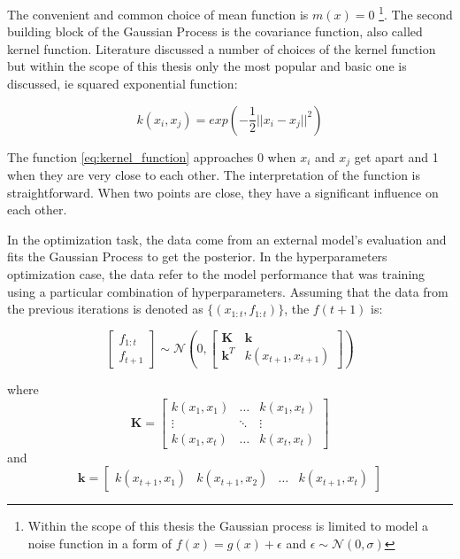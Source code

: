 The convenient and common choice of mean function is $m(x) = 0$ \footnote{ Within the scope of this thesis the Gaussian process is limited to model a noise function in a form of $f(x) = g(x) + \epsilon$ and $\epsilon \sim \mathcal{N}(0, \sigma)$ }. 
The second building block of the Gaussian Process is the covariance function, also called kernel function. Literature discussed a number of choices of the kernel function but within the scope of this thesis only the most popular and basic one is discussed, ie squared exponential function: 

\begin{equation}
\label{eq:kernel_function}
    k(x_i,x_j) = exp\left( - \frac{1}{2} ||x_i - x_j||^2 \right)
\end{equation}

The function \ref{eq:kernel_function} approaches $0$ when $x_i$ and $x_j$ get apart and 1 when they are very close to each other. The interpretation of the function is straightforward. When two points are close, they have a significant influence on each other. 

In the optimization task, the data come from an external model's evaluation and fits the Gaussian Process to get the posterior. In the hyperparameters optimization case, the data refer to the model performance that was training using a particular combination of hyperparameters.     
Assuming that the data from the previous iterations is denoted as $\{ (x_{1:t}, f_{1:t}) \}$, the $f(t+1)$ is:

\begin{equation}
\label{eq:GP_priory}
    \begin{bmatrix}
         f_{1:t} \\
         f_{t+1}
        \end{bmatrix}  \sim  \mathcal{N}  \left( 0,  \begin{bmatrix}
         \mathbf{K} & \mathbf{k}  \\
         \mathbf{k}^{T} &  k(x_{t+1},x_{t+1})
        \end{bmatrix}  \right)  
\end{equation}

where 
\begin{equation}
    \mathbf{K} = \begin{bmatrix}
         k(x_{1},x_1) & \ldots  &  k(x_{1},x_t)  \\
          \vdots & \ddots & \vdots \\
           k(x_{1},x_t) & \ldots  &  k(x_{t},x_t)
        \end{bmatrix}
\end{equation}
and
\begin{equation}
    \mathbf{k} = \begin{bmatrix}
        k(x_{t+1},x_1) &  k(x_{t+1},x_2) &  \ldots & k(x_{t+1},x_t) 
        \end{bmatrix}
\end{equation}

